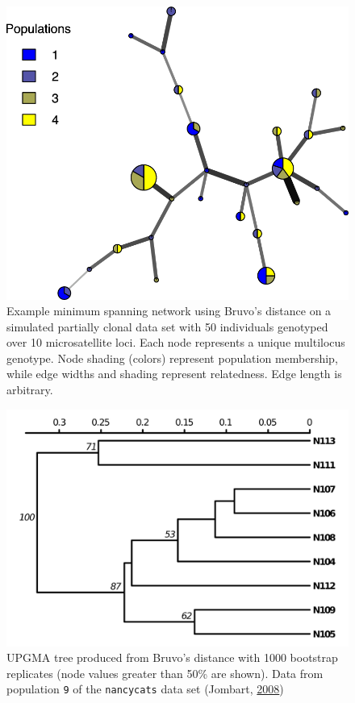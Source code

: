 \documentclass[double,12pt]{beavtex}
\begin{document}
  \begin{figure}
  
  {\centering \includegraphics[width=0.8\linewidth]{figure/poppr/bruvo_color} 
  
  }
  
  \caption[Example minimum spanning network using Bruvo's distance on a simulated
  partially clonal data set with 50 individuals genotyped over 10 microsatellite
  loci.]{Example minimum spanning network using Bruvo's distance on a simulated
  partially clonal data set with 50 individuals genotyped over 10 microsatellite
  loci. Each node represents a unique multilocus genotype. Node shading (colors)
  represent population membership, while edge widths and shading represent
  relatedness. Edge length is arbitrary.}\label{fig:poppr3}
  \end{figure}
  
  \newpage
  
  \begin{figure}
  
  {\centering \includegraphics[width=0.8\linewidth]{figure/poppr/nancy9-boot-redo} 
  
  }
  
  \caption[UPGMA tree produced from Bruvo's distance with 1000 bootstrap
  replicates.]{UPGMA tree produced from Bruvo's distance with 1000 bootstrap replicates
  (node values greater than 50\% are shown). Data from population
  \texttt{9} of the \texttt{nancycats} data set (Jombart,
  \protect\hyperlink{ref-Jombart_2008}{2008})}\label{fig:poppr4}
  \end{figure}
  
\end{document}
